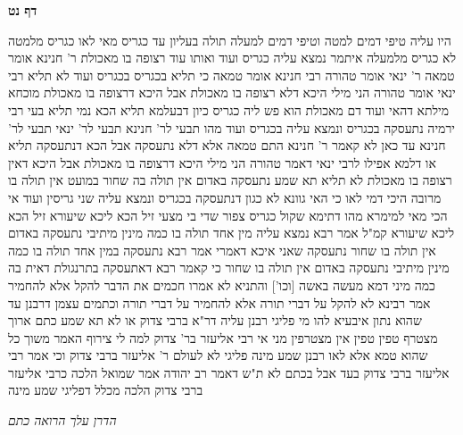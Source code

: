 \documentclass[12pt, openany]{book}
\newcommand{\sethebfont}{
\fontsize{10.5pt}{21.0pt} \selectfont
}
\newcommand{\twocol}[1]{
	{\sethebfont \begin{multicols}{2}
			#1
	\end{multicols}}	
}
\newcommand{\sectname}{}
\newcommand{\newsection}[1]{
	\addcontentsline{toc}{section}{#1}
	\renewcommand{\sectname}{#1}	
	\vspace{-\baselineskip}
	\begin{center}
		\textbf{%
\fontsize{16pt}{16pt}\selectfont
			#1}
	\end{center}
	\vspace{-\baselineskip}
	\nopagebreak
}
\begin{document}
\newsection{דף נט}
\twocol{היו עליה טיפי דמים למטה וטיפי דמים למעלה תולה בעליון עד כגריס מאי לאו כגריס מלמטה לא כגריס מלמעלה 
איתמר נמצא עליה כגריס ועוד ואותו עוד רצופה בו מאכולת ר' חנינא אומר טמאה ר' ינאי אומר טהורה רבי חנינא אומר טמאה כי תליא בכגריס בכגריס ועוד לא תליא 
רבי ינאי אומר טהורה הני מילי היכא דלא רצופה בו מאכולת אבל היכא דרצופה בו מאכולת מוכחא מילתא דהאי ועוד דם מאכולת הוא פש ליה כגריס כיון דבעלמא תליא הכא נמי תליא 
בעי רבי ירמיה נתעסקה בכגריס ונמצא עליה בכגריס ועוד מהו תבעי לר' חנינא תבעי לר' ינאי 
תבעי לר' חנינא עד כאן לא קאמר ר' חנינא התם טמאה אלא דלא נתעסקה אבל הכא דנתעסקה תליא או דלמא אפילו לרבי ינאי דאמר טהורה הני מילי היכא דרצופה בו מאכולת אבל היכא דאין רצופה בו מאכולת לא תליא 
תא שמע נתעסקה באדום אין תולה בה שחור במועט אין תולה בו מרובה היכי דמי לאו כי האי גוונא 
לא כגון דנתעסקה בכגריס ונמצא עליה שני גריסין ועוד אי הכי מאי למימרא 
מהו דתימא שקול כגריס צפור שדי בי מצעי זיל הכא ליכא שיעורא זיל הכא ליכא שיעורא קמ"ל 
אמר רבא נמצא עליה מין אחד תולה בו כמה מינין מיתיבי נתעסקה באדום אין תולה בו שחור נתעסקה שאני 
איכא דאמרי אמר רבא נתעסקה במין אחד תולה בו כמה מינין מיתיבי נתעסקה באדום אין תולה בו שחור כי קאמר רבא דאתעסקה בתרנגולת דאית בה כמה מיני דמא
מעשה באשה [וכו'] והתניא לא אמרו חכמים את הדבר להקל אלא להחמיר 
אמר רבינא לא להקל על דברי תורה אלא להחמיר על דברי תורה וכתמים עצמן דרבנן
עד שהוא נתון איבעיא להו מי פליגי רבנן עליה דר"א ברבי צדוק או לא 
תא שמע כתם ארוך מצטרף טפין טפין אין מצטרפין מני אי רבי אליעזר בר' צדוק למה לי צירוף האמר משוך כל שהוא טמא 
אלא לאו רבנן שמע מינה פליגי לא לעולם ר' אליעזר ברבי צדוק וכי אמר רבי אליעזר ברבי צדוק בעד אבל בכתם לא 
ת"ש דאמר רב יהודה אמר שמואל הלכה כרבי אליעזר ברבי צדוק הלכה מכלל דפליגי שמע מינה
\par \par {\large\emph{הדרן עלך הרואה כתם}}\par \par }
\end{document}
